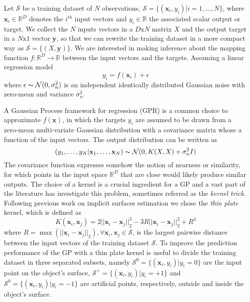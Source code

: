 Let $\mathcal{S}$ be a training dataset of $N$ observations, $\mathcal{S}=\{(\mathbf{x}_i, y_i)|i=1,\dots,N\}$, where $\mathbf{x}_i\in\mathbb{R}^D$ denotes the $i^{th}$ input vectors and $y_i\in\mathbb{R}$ the associated scalar output or target.  We collect the $N$ inputs vectors in a $D\text{x}N$ matrix $X$ and the output target in a $N\text{x}1$ vector $\mathbf{y}$, so that we can rewrite the training dataset in a more compact way as $\mathcal{S}=\{(X,\mathbf{y})\}$. We are interested in making inference about the mapping function $f:\mathbb{R}^D\rightarrow\mathbb{R}$ between the input vectors and the targets. Assuming a linear regression model
$$
y_i=f(\mathbf{x}_i)+\epsilon
$$
where $\epsilon\thicksim\mathcal{N}(0,\sigma_n^2)$ is an independent identically distributed Gaussian noise with zero-mean and variance $\sigma_n^2$. 

A Gaussian Process framework for regression (GPR) is a common choice to approximate $f(\mathbf{x})$, in which the targets $y_i$ are assumed to be drawn from a zero-mean multi-variate Gaussian distribution with a covariance matrix whose a function of the input vectors. The output distribution can be written as
$$
(y_1,\dots,y_N|\mathbf{x}_1,\dots,\mathbf{x}_N)\thicksim\mathcal{N}(0,K(X,X)+\sigma_n^2I)
$$
The covariance function expresses somehow the notion of nearness or similarity, for which points in the input space $\mathbb{R}^D$ that are close would likely produce similar outputs. The choice of a kernel is a crucial ingredient for a GP and a vast part of the literature has investigate this problem, sometimes referred as the \emph{kernel trick}. Following previous work on implicit surfaces estimation we chose the \emph{thin plate} kernel, which is defined as
$$
K(\mathbf{x}_i,\mathbf{x}_j)=2||\mathbf{x}_i-\mathbf{x}_j||_2^3-3R||\mathbf{x}_i-\mathbf{x}_j||_2^2+R^3
$$
where $R=\max(||\mathbf{x}_i-\mathbf{x}_j||_2),\forall\mathbf{x}_i,\mathbf{x}_j\in\mathcal{S}$, is the largest pairwise distance between the input vectors of the training dataset $\mathcal{S}$. To improve the prediction performance of the GP with a thin plate kernel is useful to divide the training dataset in three separated subsets, namely $\mathcal{S}^0=\{(\mathbf{x}_i,y_i)|y_i=0\}$ are the input point on the object's surface, $\mathcal{S}^+=\{(\mathbf{x}_i,y_i)|y_i=+1\}$ and $\mathcal{S}^0=\{(\mathbf{x}_i,y_i)|y_i=-1\}$ are artificial points, respectively, outside and inside the object's surface. 

